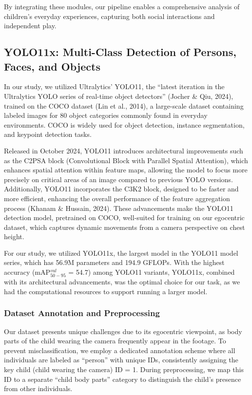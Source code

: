 \documentclass[
  man,floatsintext]{apa6}
\begin{document}
By integrating these modules, our pipeline enables a comprehensive analysis of children's everyday experiences, capturing both social interactions and independent play.

\subsection{YOLO11x: Multi-Class Detection of Persons, Faces, and Objects}\label{sup-yolo11x}

In our study, we utilized Ultralytics' YOLO11, the ``latest iteration in the Ultralytics YOLO series of real-time object detectors'' (Jocher \& Qiu, 2024), trained on the COCO dataset (Lin et al., 2014), a large-scale dataset containing labeled images for 80 object categories commonly found in everyday environments. COCO is widely used for object detection, instance segmentation, and keypoint detection tasks.

Released in October 2024, YOLO11 introduces architectural improvements such as the C2PSA block (Convolutional Block with Parallel Spatial Attention), which enhances spatial attention within feature maps, allowing the model to focus more precisely on critical areas of an image compared to previous YOLO versions. Additionally, YOLO11 incorporates the C3K2 block, designed to be faster and more efficient, enhancing the overall performance of the feature aggregation process (Khanam \& Hussain, 2024). These advancements make the YOLO11 detection model, pretrained on COCO, well-suited for training on our egocentric dataset, which captures dynamic movements from a camera perspective on chest height.

For our study, we utilized YOLO11x, the largest model in the YOLO11 model series, which has 56.9M parameters and 194.9 GFLOPs. With the highest accuracy (mAP\(^{val}_{50-95}\) = 54.7) among YOLO11 variants, YOLO11x, combined with its architectural advancements, was the optimal choice for our task, as we had the computational resources to support running a larger model.

\subsubsection{Dataset Annotation and Preprocessing}\label{dataset-annotation-and-preprocessing-1}

Our dataset presents unique challenges due to its egocentric viewpoint, as body parts of the child wearing the camera frequently appear in the footage. To prevent misclassification, we employ a dedicated annotation scheme where all individuals are labeled as ``person'' with unique IDs, consistently assigning the key child (child wearing the camera) ID = 1. During preprocessing, we map this ID to a separate ``child body parts'' category to distinguish the child's presence from other individuals.
\end{document}
